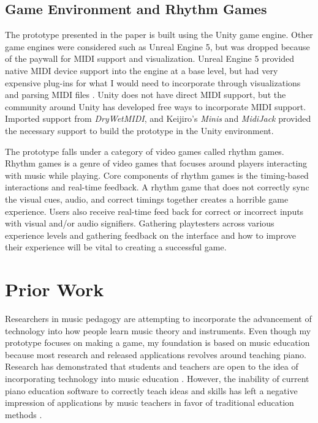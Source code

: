 \documentclass[10pt,twocolumn]{article}
\begin{document}
\subsection{Game Environment and Rhythm Games}

The prototype presented in the paper is built using the Unity game engine. Other game engines were considered such as Unreal Engine 5, but was dropped because of the paywall for MIDI support and visualization. Unreal Engine 5 provided native MIDI device support into the engine at a base level, but had very expensive plug-ins for what I would need to incorporate through visualizations and parsing MIDI files \cite{MidiEngine3}. Unity does not have direct MIDI support, but the community around Unity has developed free ways to incorporate MIDI support. Imported support from \textit{DryWetMIDI}, and Keijiro's \textit{Minis} and \textit{MidiJack} provided the necessary support to build the prototype in the Unity environment. 

The prototype falls under a category of video games called rhythm games. Rhythm games is a genre of video games that focuses around players interacting with music while playing. Core components of rhythm games is the timing-based interactions and real-time feedback. A rhythm game that does not correctly sync the visual cues, audio, and correct timings together creates a horrible game experience. Users also receive real-time feed back for correct or incorrect inputs with visual and/or audio signifiers. Gathering playtesters across various experience levels and gathering feedback on the interface and how to improve their experience will be vital to creating a successful game. 


\section{Prior Work}
Researchers in music pedagogy are attempting to incorporate the advancement of technology into how people learn music theory and instruments. Even though my prototype focuses on making a game, my foundation is based on music education because most research and released applications revolves around teaching piano. Research has demonstrated that students and teachers are open to the idea of incorporating technology into music education \cite{PianoTeachingAndLearningConcerns}. However, the inability of current piano education software to correctly teach ideas and skills has left a negative impression of applications by music teachers in favor of traditional education methods \cite{Computer-AssistedInstructionPianoEducation}\cite{E-LearningPiano}\cite{PianoTeachingandthePandemic}. 
\end{document}
